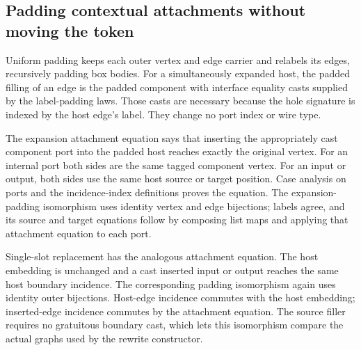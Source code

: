 

\subsection{Padding contextual attachments without moving the token}

Uniform padding keeps each outer vertex and edge carrier and relabels its
edges, recursively padding box bodies. For a simultaneously expanded host,
the padded filling of an edge is the padded component with interface equality
casts supplied by the label-padding laws. Those casts are necessary because
the hole signature is indexed by the host edge's label. They change no port
index or wire type.


The expansion attachment equation says that inserting the appropriately
cast component port into the padded host reaches exactly the original vertex.
For an internal port both sides are the same tagged component vertex. For
an input or output, both sides use the same host source or target position.
Case analysis on ports and the incidence-index definitions proves the equation.
The expansion-padding isomorphism uses identity vertex and edge bijections;
labels agree, and its source and target equations follow by composing list
maps and applying that attachment equation to each port.



Single-slot replacement has the analogous attachment equation. The
host embedding is unchanged and a cast inserted input or output reaches the
same host boundary incidence. The corresponding padding isomorphism again
uses identity outer bijections. Host-edge incidence commutes with the host
embedding; inserted-edge incidence commutes by the attachment equation.
The source filler requires no gratuitous boundary cast, which lets this
isomorphism compare the actual graphs used by the rewrite constructor.


